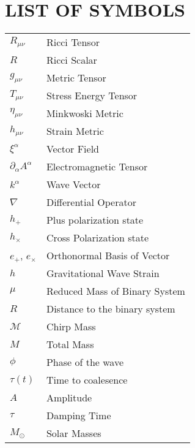 \chapter*{LIST OF SYMBOLS}
\begin{tabular}{ll}
	$R_{\mu \nu}$	 & \hspace{2em} Ricci Tensor \\
	$R$ & \hspace{2em} Ricci Scalar \\
	$g_{\mu \nu}$ & \hspace{2em} Metric Tensor\\
	$T_{\mu \nu}$ & \hspace{2em} Stress Energy Tensor\\
	$\eta_{\mu \nu}$ & \hspace{2em} Minkwoski Metric \\
	$h_{\mu \nu}$ & \hspace{2em} Strain Metric \\
	$\xi^{\alpha}$ & \hspace{2em} Vector Field \\
	$\partial_{\alpha}A^{\alpha}$ & \hspace{2em} Electromagnetic Tensor \\
	$k^{\alpha}$ & \hspace{2em} Wave Vector \\
	$\nabla$ & \hspace{2em} Differential Operator \\
	$h_{+}$ & \hspace{2em} Plus polarization state\\
	$h_{\times}$ & \hspace{2em} Cross Polarization state \\
	${e}_{+}$, ${e}_{\times}$ & \hspace{2em} Orthonormal Basis of Vector\\
	$h$ & \hspace{2em} Gravitational Wave Strain\\
	$\mu$ & \hspace{2em} Reduced Mass of Binary System\\
	$R$ & \hspace{2em} Distance to the binary system\\
	$\mathcal{M}$ & \hspace{2em} Chirp Mass\\
    $M$ & \hspace{2em} Total Mass\\
    $\phi$ & \hspace{2em} Phase of the wave\\
    $\tau(t)$ & \hspace{2em} Time to coalesence\\
    $A$ & \hspace{2em} Amplitude\\
    $\tau$ & \hspace{2em} Damping Time\\
    $M_\odot$ & \hspace{2em} Solar Masses
    \end{tabular}